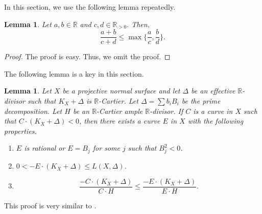 \documentclass[12pt,twoside]{amsart}
\newtheorem{lem}[thm]{Lemma}
\theoremstyle{definition}
\begin{document}
In this section, we use the following lemma repeatedly. 

\begin{lem}\label{easy-lemma}
Let $a, b\in \mathbb R$ and $c, d\in \mathbb R_{>0}.$
Then, 
$$\frac{a+b}{c+d}\leq\max\{\frac{a}{c},\frac{b}{d}\}.$$
\end{lem}

\begin{proof}
The proof is easy. Thus, we omit the proof. 
\end{proof}

The following lemma is a key in this section. 

\begin{lem}\label{keylemma}
Let $X$ be a projective normal surface and 
let $\Delta$ be an effective $\mathbb{R}$-divisor 
such that $K_X+\Delta$ is $\mathbb{R}$-Cartier. 
Let $\Delta=\sum b_iB_i$ be the prime decomposition. 
Let $H$ be an $\mathbb{R}$-Cartier ample $\mathbb{R}$-divisor. 
If $C$ is a curve in $X$ such that $C\cdot (K_X+\Delta)<0$, then 
there exists a curve $E$ in $X$ with the following properties. 
\begin{enumerate}
\item{$E$ is rational or $E=B_j$ for some $j$ such that $B_j^2<0$.}
\item{$0<-E\cdot (K_X+\Delta) \leq L(X, \Delta)$}.
\item{
$$\frac{-C\cdot (K_X+\Delta)}{C\cdot H} \leq \frac{-E\cdot (K_X+\Delta)}{E\cdot H}.$$
}
\end{enumerate}
\end{lem}


This proof is very similar to \cite[Theorem~1.13]{KM}. 
\end{document}
